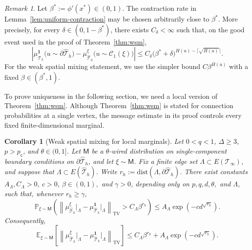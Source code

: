 \documentclass[11pt]{amsart}
\theoremstyle{plain}
\newtheorem{corollary}[theorem]{Corollary}
\theoremstyle{definition}
\theoremstyle{remark}
\newtheorem{remark}[theorem]{Remark}
\newcommand{\dreg}{\widehat {\mathcal T}_h}
\newcommand{\pc}{p_{\mathsf{c}}}
\newcommand{\dist}{\mathrm{dist}}
\begin{document}
\begin{remark}
\label{rem:wsm-rate}
Let $\beta^*:=\phi'(x^*)\in(0,1)$. The contraction rate in Lemma~\ref{lem:uniform-contraction} may be chosen arbitrarily close to $\beta^*$. More precisely, for every $\delta\in(0,1-\beta^*)$, there exists $C_\delta<\infty$ such that, on the good event used in the proof of Theorem~\ref{thm:wsm},
\[
\left|
    \mu_{\dreg}^{\mathbf 1}
    \bigl(u\sim\partial\dreg\bigr)
    -
    \mu_{\dreg}^{\xi}
    \bigl(u\sim\mathcal C_1(\xi)\bigr)
\right|
\le
C_\delta
\bigl(\beta^*+\delta\bigr)^{
    H(u)-\lceil\sqrt{H(u)}\rceil
}.
\]
For the weak spatial mixing statement, we use the simpler bound
$C\beta^{H(u)}$ with a fixed $\beta\in(\beta^*,1)$.
\end{remark}

To prove uniqueness in the following section, we need a local version of Theorem~\ref{thm:wsm}. Although Theorem~\ref{thm:wsm} is stated for connection probabilities at a single vertex, the message estimate in its proof controls every fixed finite-dimensional marginal.

\begin{corollary}[Weak spatial mixing for local marginals]
\label{cor:local-wsm}
Let $0<q<1$, $\Delta\ge3$, $p>\pc$, and $\theta\in(0,1]$. Let $\mathsf M$ be a $\theta$-wired distribution on single-component boundary conditions on $\partial\dreg$, and let $\xi\sim\mathsf M$. Fix a finite edge set $\Lambda\subset E(\mathcal T_\infty)$, and suppose that $\Lambda\subset E(\dreg)$. Write $r_h:=\dist(\Lambda,\partial\dreg)$.
There exist constants $A_\Lambda,C_\Lambda>0$, $c>0$, $\beta\in(0,1),$ and $\gamma>0$, depending only on $p,q,d,\theta,$ and $\Lambda$, such that, whenever $r_h\ge\gamma$,
\[
\mathbb P_{\xi\sim\mathsf M}
\left(
    \left\|
        \mu_{\dreg}^{\xi}\vert_\Lambda
        -
        \mu_{\dreg}^{\mathbf 1}\vert_\Lambda
    \right\|_{\mathrm{TV}}
    >
    C_\Lambda\beta^{r_h}
\right)
\le
A_\Lambda
\exp\left(
    -c d^{\sqrt{r_h}}
\right).
\]
Consequently,
\[
\mathbb E_{\xi\sim\mathsf M}
\left[
    \left\|
        \mu_{\dreg}^{\xi}\vert_\Lambda
        -
        \mu_{\dreg}^{\mathbf 1}\vert_\Lambda
    \right\|_{\mathrm{TV}}
\right]
\le
C_\Lambda\beta^{r_h}
+
A_\Lambda
\exp\left(
    -c d^{\sqrt{r_h}}
\right).
\]
\end{corollary}
\end{document}
